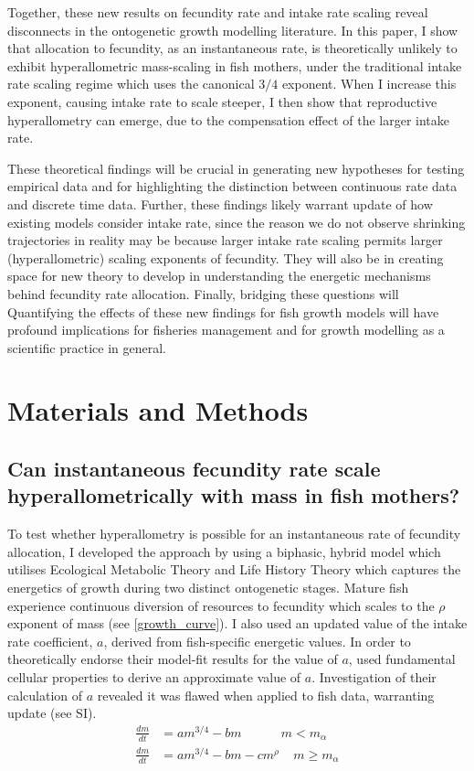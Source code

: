 \documentclass[a4paper]{article} %
\begin{document}
    Together, these new results on fecundity rate and intake rate scaling reveal disconnects in the ontogenetic growth modelling literature. In this paper, I show that allocation to fecundity, as an instantaneous rate, is theoretically unlikely to exhibit hyperallometric mass-scaling in fish mothers, under the traditional intake rate scaling regime which uses the canonical $3/4$ exponent. When I increase this exponent, causing intake rate to scale steeper, I then show that reproductive hyperallometry can emerge, due to the compensation effect of the larger intake rate.
    
    These theoretical findings will be crucial in generating new hypotheses for testing empirical data and for highlighting the distinction between continuous rate data and discrete time data. Further, these findings likely warrant update of how existing models consider intake rate, since the reason we do not observe shrinking trajectories in reality may be because larger intake rate scaling permits larger (hyperallometric) scaling exponents of fecundity. They will also be in creating space for new theory to develop in understanding the energetic mechanisms behind fecundity rate allocation. Finally, bridging these questions will  Quantifying the effects of these new findings for fish growth models will have profound implications for fisheries management and for growth modelling as a scientific practice in general.
\section{Materials and Methods}\thispagestyle{plain}
\subsection{Can instantaneous fecundity rate scale hyperallometrically with mass in fish mothers?}

To test whether hyperallometry is possible for an instantaneous rate of fecundity allocation, I developed the \cite{Charnov2001} approach by using a biphasic, hybrid model which utilises Ecological Metabolic Theory and Life History Theory which captures the energetics of growth during two distinct ontogenetic stages. Mature fish experience continuous diversion of resources to fecundity which scales to the $\rho$ exponent of mass (see \cref{growth_curve}). I also used an updated value of the intake rate coefficient, $a$, derived from fish-specific energetic values. In order to theoretically endorse their model-fit results for the value of $a$, \cite{West2001} used fundamental cellular properties to derive an approximate value of $a$. Investigation of their calculation of $a$ revealed it was flawed when applied to fish data, warranting update (see SI).
\begin{align}
    \frac{dm}{dt} &= am^{3/4} - bm \ \ \ \ \ \ \ \ \ \ \ \ \ \ m < m_{\alpha} \label{luke_model_juvenile}\\
    \frac{dm}{dt} &= am^{3/4} - bm - cm^{\rho} \ \ \ \ \ m \geq m_{\alpha} \label{luke_model}
\end{align}
\end{document}
